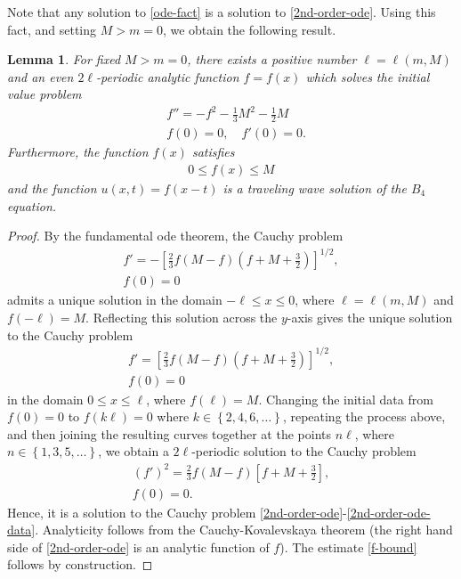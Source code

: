 \documentclass[12pt,reqno]{amsart}
\numberwithin{equation}{section}  %
\newtheorem{lemma}[theorem]{Lemma}
\begin{document}
%
Note that any solution to \eqref{ode-fact} is a solution to
\eqref{2nd-order-ode}. Using this fact, and setting $M > m = 0$, we obtain the following result.
%
%
%
%
%
%                
%
%
%
%
\begin{lemma}
  For fixed $M > m = 0$,  there exists a positive
  number $\ell = \ell(m, M)$ and an even $2\ell$-periodic analytic function $f =
  f(x)$ which solves the initial value problem
\begin{align}
  \label{2nd-order-ode}
& f'' = - f^{2} - \frac{1}{3} M^{2} - \frac{1}{2}M
\\
\label{2nd-order-ode-data}
& f(0)=0, \quad f'(0) = 0.
\end{align}
Furthermore, the function
  $f(x)$ satisfies
  \begin{equation}
    \label{f-bound}
  \begin{split}
  0 \le f(x) \le M
  \end{split}
  \end{equation}
  and the function $u(x,t) = f(x-t)$ is a traveling wave solution of the
  $B_{4}$ equation. 
\label{lem:ode-solution}
\end{lemma}
%
%
%
\begin{proof}
By the fundamental ode theorem, the Cauchy problem
\begin{gather}
  \label{ode-cauchy-left}
   f'
  = -\left [ \frac{2}{3} f
  \left( M -f \right )
  \left ( f +M + \frac{3}{2}\right ) \right
  ]^{1/2},
  \\
\label{ode-cauchy-data-left}
   f(0) =0
\end{gather}
admits a unique solution in the domain $-\ell \le x \le 0$, where $\ell =
\ell(m, M)$ and $f(-\ell) = M$. Reflecting this solution across the $y$-axis
gives the unique solution to the Cauchy problem 
\begin{gather}
  \label{ode-cauchy-right}
   f'
  = \left [ \frac{2}{3} f
  \left( M -f \right )
  \left ( f +M + \frac{3}{2} \right ) \right
  ]^{1/2},
  \\
\label{ode-cauchy-data-right}
   f(0) =0
\end{gather}
in the domain $0 \le x \le \ell$, where $f(\ell) = M$. 
Changing the
initial data from $f(0) =0$ to $f(k\ell)=0$ where $k \in \left\{ 2, 4, 6,\dots
\right\}$, repeating the process above, and then joining the resulting curves
together at the points $n \ell$, where $n \in \left\{ 1,3,5,\dots \right\}$, we
obtain a $2\ell$-periodic
solution to the Cauchy problem
\begin{gather}
  (f')^{2}
  = \frac{2}{3} f
  \left( M -f \right )
  \left [ f +M + \frac{3}{2}  \right ],
  \\
   f(0) =0.
\end{gather}
Hence, it is a solution to the Cauchy problem
\eqref{2nd-order-ode}-\eqref{2nd-order-ode-data}. Analyticity follows from the
Cauchy-Kovalevskaya theorem (the right hand side of \eqref{2nd-order-ode} is an
analytic function of $f$). The
estimate \eqref{f-bound} follows by construction.
%
%
\end{proof}
\end{document}
